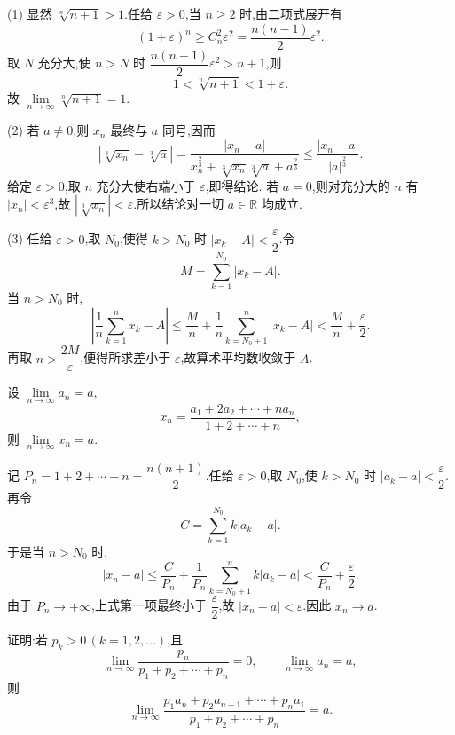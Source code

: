 \begin{solution}

  (1) 显然 $\sqrt[n]{n+1}>1$.任给 $\varepsilon>0$,当 $n\geq2$ 时,由二项式展开有
  \[
    (1+\varepsilon)^n
    \geq C_n^2\varepsilon^2
    =\dfrac{n(n-1)}{2}\varepsilon^2.
  \]
  取 $N$ 充分大,使 $n>N$ 时
  $\dfrac{n(n-1)}{2}\varepsilon^2>n+1$,则
  \[
    1<\sqrt[n]{n+1}<1+\varepsilon.
  \]
  故 $\displaystyle \lim\limits_{n\to\infty}\sqrt[n]{n+1}=1$.

  (2) 若 $a\neq0$,则 $x_n$ 最终与 $a$ 同号,因而
  \[
    \left|\sqrt[3]{x_n}-\sqrt[3]{a}\right|
    =\dfrac{|x_n-a|}
    {x_n^{\frac{2}{3}}+\sqrt[3]{x_n}\sqrt[3]{a}+a^{\frac{2}{3}}}
    \leq\dfrac{|x_n-a|}{|a|^{\frac{2}{3}}}.
  \]
  给定 $\varepsilon>0$,取 $n$ 充分大使右端小于 $\varepsilon$,即得结论.
  若 $a=0$,则对充分大的 $n$ 有 $|x_n|<\varepsilon^3$,故
  $|\sqrt[3]{x_n}|<\varepsilon$.所以结论对一切 $a\in\mathbb{R}$ 均成立.

  (3) 任给 $\varepsilon>0$,取 $N_0$,使得 $k>N_0$ 时
  $|x_k-A|<\dfrac{\varepsilon}{2}$.令
  \[
    M=\sum\limits_{k=1}^{N_0}|x_k-A|.
  \]
  当 $n>N_0$ 时,
  \[
    \left|\dfrac{1}{n}\sum\limits_{k=1}^n x_k-A\right|
    \leq \dfrac{M}{n}+\dfrac{1}{n}\sum\limits_{k=N_0+1}^n|x_k-A|
    <\dfrac{M}{n}+\dfrac{\varepsilon}{2}.
  \]
  再取 $n>\dfrac{2M}{\varepsilon}$,便得所求差小于 $\varepsilon$,故算术平均数收敛于 $A$.
\end{solution}

\begin{example}
  设 $\displaystyle \lim\limits_{n\to\infty}a_n=a$,
  \[
    x_n=\dfrac{a_1+2a_2+\cdots+na_n}{1+2+\cdots+n},
  \]
  则 $\displaystyle \lim\limits_{n\to\infty}x_n=a$.
\end{example}
\exampleblank

\begin{solution}
  记 $P_n=1+2+\cdots+n=\dfrac{n(n+1)}{2}$.任给 $\varepsilon>0$,取
  $N_0$,使 $k>N_0$ 时 $|a_k-a|<\dfrac{\varepsilon}{2}$.再令
  \[
    C=\sum\limits_{k=1}^{N_0}k|a_k-a|.
  \]
  于是当 $n>N_0$ 时,
  \[
    |x_n-a|
    \leq \dfrac{C}{P_n}
    +\dfrac{1}{P_n}\sum\limits_{k=N_0+1}^n k|a_k-a|
    <\dfrac{C}{P_n}+\dfrac{\varepsilon}{2}.
  \]
  由于 $P_n\to+\infty$,上式第一项最终小于 $\dfrac{\varepsilon}{2}$,故
  $|x_n-a|<\varepsilon$.因此 $x_n\to a$.
\end{solution}

\begin{example}
  证明:若 $p_k>0\,(k=1,2,\ldots)$,且
  \[
    \displaystyle\lim\limits_{n\to\infty}\dfrac{p_n}{p_1+p_2+\cdots+p_n}=0,
    \qquad
    \lim\limits_{n\to\infty}a_n=a,
  \]
  则
  \[
    \displaystyle\lim\limits_{n\to\infty}
    \dfrac{p_1a_n+p_2a_{n-1}+\cdots+p_na_1}{p_1+p_2+\cdots+p_n}=a.
  \]
\end{example}
\exampleblank

